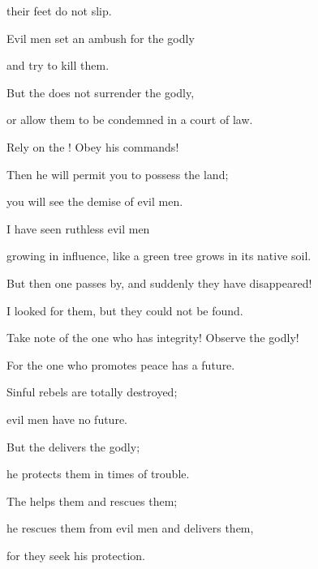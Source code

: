{\par }{\Q their feet do not
slip.
\par }{\Q {}Evil
men set an ambush
for the godly
\par }{\Q and try
to kill them.
\par }{\Q {}But the
{}
does not
surrender
the godly,
\par }{\Q or
allow them to be condemned in a court of law.
\par }{\Q {}Rely
on the
{}! Obey
his commands!

\par }{\Q Then he will permit
you to possess
the land;
\par }{\Q you will see
the demise of evil men.
\par }{\Q {}I have seen
ruthless
evil
men

\par }{\Q growing
in influence, like a green
tree grows in its native soil.
\par }{\Q {}But then one
passes
by, and suddenly
they have disappeared!

\par }{\Q I looked
for them, but
they could not
be found.
\par }{\Q {}Take note
of the one who has integrity! Observe
the godly!

\par }{\Q For
the one
who promotes peace
has a future.
\par }{\Q {}Sinful rebels
are totally
destroyed;
\par }{\Q evil
men have no future.
\par }{\Q {}But the
{}
delivers
the godly;
\par }{\Q he protects
them in times
of trouble.
\par }{\Q {}The
{}
helps
them and rescues
them;
\par }{\Q he rescues
them from
evil
men and delivers
them,

\par }{\Q for
they seek his protection.


\par }

